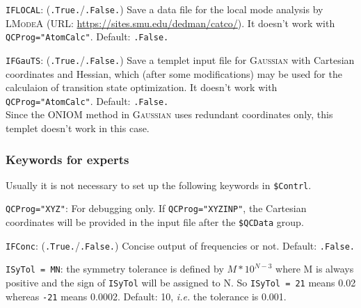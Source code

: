 \documentclass[12pt,english]{extarticle}
\begin{document}
\bigskip{}\bigskip{}
\verb|IFLOCAL|: (\verb|.True.|/\verb|.False.|) Save a data file for the local mode analysis by \textsc{LModeA} (URL: \href{https://sites.smu.edu/dedman/catco/}{https://sites.smu.edu/dedman/catco/}). It doesn't work with \verb|QCProg="AtomCalc"|. Default: \verb|.False.|

\bigskip{}\bigskip{}
\verb|IFGauTS|: (\verb|.True.|/\verb|.False.|) Save a templet input file for \textsc{Gaussian} with Cartesian coordinates and Hessian, which (after some modifications) may be used for the calculaion of transition state optimization. It doesn't work with \verb|QCProg="AtomCalc"|. Default: \verb|.False.| \\
Since the ONIOM method in \textsc{Gaussian} uses redundant coordinates only, this templet doesn't work in this case.

\subsubsection{Keywords for experts} \label{subsec:inp-qcdata-expert}

Usually it is not necessary to set up the following keywords in \texttt{\$Contrl}.

\bigskip{}\bigskip{}
\verb|QCProg="XYZ"|: For debugging only. If \verb|QCProg="XYZINP"|, the Cartesian coordinates will be provided in the input file after the \texttt{\$QCData} group.

\bigskip{}\bigskip{}
\verb|IFConc|: (\verb|.True.|/\verb|.False.|) Concise output of frequencies or not. Default: \verb|.False.|

\bigskip{}\bigskip{}
\verb|ISyTol = MN|: the symmetry tolerance is defined by $M*10^{N-3}$ where M
is always positive and the sign of \verb|ISyTol| will be assigned to N. So
\verb|ISyTol = 21| means 0.02 whereas \verb|-21| means 0.0002. Default: 10, \emph{i.e.} the tolerance is 0.001.
\end{document}
